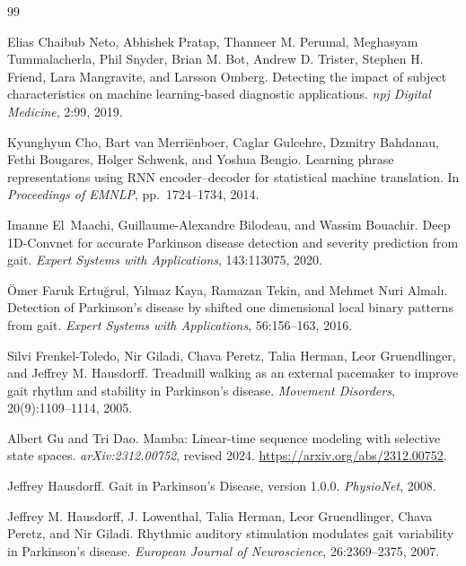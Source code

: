 \begin{thebibliography}{99}

Elias Chaibub Neto, Abhishek Pratap, Thanneer M. Perumal, Meghasyam Tummalacherla, Phil Snyder, Brian M. Bot, Andrew D. Trister, Stephen H. Friend, Lara Mangravite, and Larsson Omberg.
Detecting the impact of subject characteristics on machine learning-based diagnostic applications.
\emph{npj Digital Medicine}, 2:99, 2019.

Kyunghyun Cho, Bart van Merri\"enboer, Caglar Gulcehre, Dzmitry Bahdanau, Fethi Bougares, Holger Schwenk, and Yoshua Bengio.
Learning phrase representations using RNN encoder--decoder for statistical machine translation.
In \emph{Proceedings of EMNLP}, pp.\ 1724--1734, 2014.

Imanne El~Maachi, Guillaume-Alexandre Bilodeau, and Wassim Bouachir.
Deep 1D-Convnet for accurate Parkinson disease detection and severity prediction from gait.
\emph{Expert Systems with Applications}, 143:113075, 2020.

\"Omer Faruk Ertu\u{g}rul, Y\i lmaz Kaya, Ramazan Tekin, and Mehmet Nuri Almal\i.
Detection of Parkinson's disease by shifted one dimensional local binary patterns from gait.
\emph{Expert Systems with Applications}, 56:156--163, 2016.

Silvi Frenkel-Toledo, Nir Giladi, Chava Peretz, Talia Herman, Leor Gruendlinger, and Jeffrey M. Hausdorff.
Treadmill walking as an external pacemaker to improve gait rhythm and stability in Parkinson's disease.
\emph{Movement Disorders}, 20(9):1109--1114, 2005.

Albert Gu and Tri Dao.
Mamba: Linear-time sequence modeling with selective state spaces.
\emph{arXiv:2312.00752}, revised 2024.
\url{https://arxiv.org/abs/2312.00752}.

Jeffrey Hausdorff.
Gait in Parkinson's Disease, version 1.0.0.
\emph{PhysioNet}, 2008.

Jeffrey M. Hausdorff, J. Lowenthal, Talia Herman, Leor Gruendlinger, Chava Peretz, and Nir Giladi.
Rhythmic auditory stimulation modulates gait variability in Parkinson's disease.
\emph{European Journal of Neuroscience}, 26:2369--2375, 2007.


\end{thebibliography}

